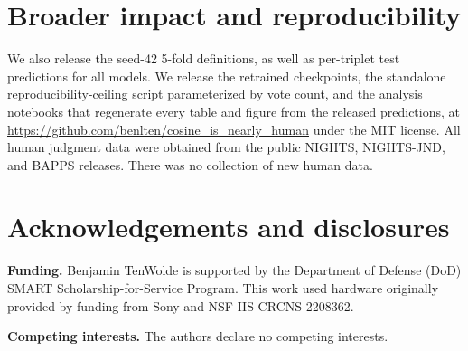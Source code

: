 \documentclass{article}
\begin{document}
\clearpage

\section*{Broader impact and reproducibility}

We also release the seed-42 5-fold definitions, as well as  per-triplet test predictions for all models.  We release the retrained checkpoints, the standalone reproducibility-ceiling script parameterized by vote count, and the analysis notebooks that regenerate every table and figure from the released predictions, at \url{https://github.com/benlten/cosine_is_nearly_human} under the MIT license. All human judgment data were obtained from the public NIGHTS, NIGHTS-JND, and BAPPS releases.  There was no collection of new human data.

\section*{Acknowledgements and disclosures}

\textbf{Funding.} Benjamin TenWolde is supported by the Department of Defense (DoD) SMART Scholarship-for-Service Program. This work used hardware originally provided by funding from Sony and NSF IIS-CRCNS-2208362.

\textbf{Competing interests.} The authors declare no competing interests.







\end{document}
